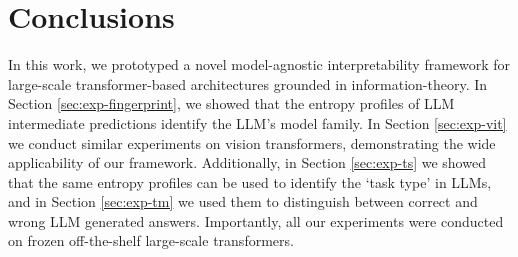 \section{Conclusions} \label{sec:conclusion}


In this work, we prototyped a novel model-agnostic interpretability framework for large-scale transformer-based architectures grounded in information-theory. In Section \ref{sec:exp-fingerprint}, we showed that the entropy profiles of LLM intermediate predictions identify the LLM's model family. In Section \ref{sec:exp-vit} we conduct similar experiments on vision transformers, demonstrating the wide applicability of our framework. Additionally, in Section \ref{sec:exp-ts} we showed that the same entropy profiles can be used to identify the `task type' in LLMs, and in Section \ref{sec:exp-tm} we used them to distinguish between correct and wrong LLM generated answers. Importantly, all our experiments were conducted on frozen off-the-shelf large-scale transformers.

% 
% 
% 

